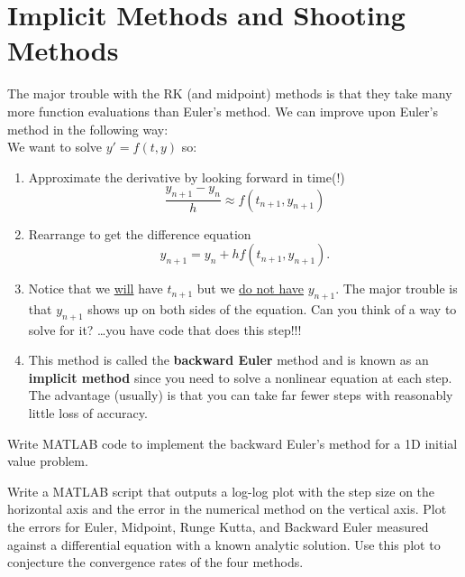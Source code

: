 \section{Implicit Methods and Shooting Methods}
\begin{problem}
    The major trouble with the RK (and midpoint) methods is that they take many more
    function evaluations than Euler's method.  We can improve upon Euler's method in the
    following way:\\
    We want to solve $y' = f(t,y)$ so:
    \begin{enumerate}
        \item Approximate the derivative by looking forward in time(!)
            \[ \frac{y_{n+1} - y_n}{h} \approx f(t_{n+1} , y_{n+1}) \]
        \item Rearrange to get the difference equation
            \[ y_{n+1} = y_n + h f(t_{n+1},y_{n+1}). \]
        \item Notice that we \underline{will} have $t_{n+1}$ but we \underline{do not
            have} $y_{n+1}$.  The major trouble is that $y_{n+1}$ shows up on both sides
            of the equation.  Can you think of a way to solve for it? \dots you have code
            that does this step!!!
        \item This method is called the {\bf backward Euler} method and is known as an
            {\bf implicit method} since you need to solve a nonlinear equation at each
            step.  The advantage (usually) is that you can take far fewer steps with
            reasonably little loss of accuracy.
    \end{enumerate}
\end{problem}

\begin{problem}
    Write MATLAB code to implement the backward Euler's method for a 1D initial value
    problem. \\
\end{problem}


\begin{problem}
    Write a MATLAB script that outputs a log-log plot with the step size on the horizontal
    axis and the error in the numerical method on the vertical axis.  Plot the errors for
    Euler, Midpoint, Runge Kutta, and Backward Euler measured against a differential
    equation with a known analytic solution.  Use this plot to conjecture the convergence
    rates of the four methods.
\end{problem}

